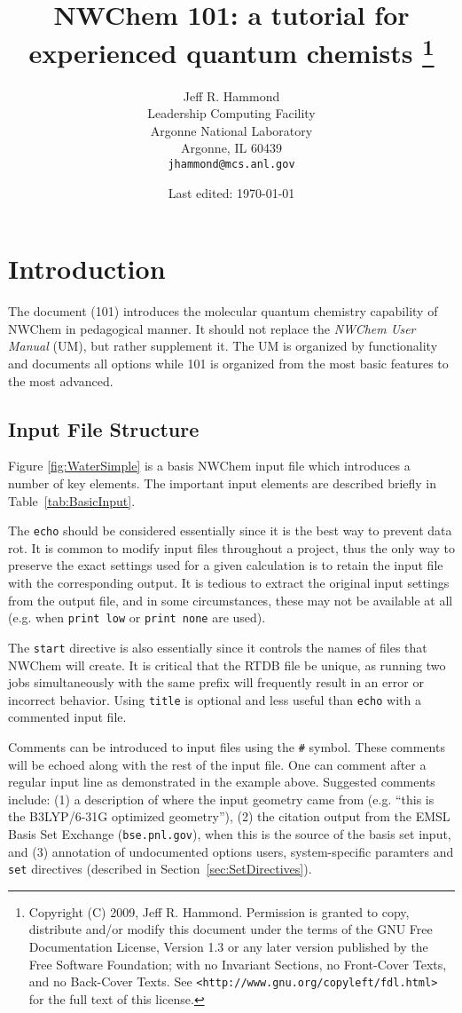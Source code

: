 \documentclass[letterpaper,12pt]{article}
\title{NWChem 101: a tutorial for experienced quantum chemists
       \footnote{
Copyright (C) 2009, Jeff R. Hammond. Permission is granted to copy, distribute and/or modify this document under the terms of the GNU Free Documentation License, Version 1.3 or any later version published by the Free Software Foundation; with no Invariant Sections, no Front-Cover Texts, and no Back-Cover Texts. See \texttt{<http://www.gnu.org/copyleft/fdl.html>} for the full text of this license.
       }
}
\author{Jeff R. Hammond \\
        Leadership Computing Facility \\
        Argonne National Laboratory \\
        Argonne, IL 60439 \\
        \texttt{jhammond@mcs.anl.gov}}
\date{Last edited: \today}
\begin{document}
\maketitle

% 

\section{Introduction}\label{sec:Introduction}

The document (101) introduces the molecular quantum chemistry capability of NWChem in pedagogical manner.  It should not replace the \textit{NWChem User Manual} (UM), but rather supplement it.  The UM is organized by functionality and documents all options while 101 is organized from the most basic features to the most advanced.

\newpage

\subsection{Input File Structure}\label{sec:InputFileStructure}

Figure \ref{fig:WaterSimple} is a basis NWChem input file which introduces a number of key elements.  The important input elements are described briefly in Table~\ref{tab:BasicInput}.

The \texttt{echo} should be considered essentially since it is the best way to prevent data rot.  It is common to modify input files throughout a project, thus the only way to preserve the exact settings used for a given calculation is to retain the input file with the corresponding output.  It is tedious to extract the original input settings from the output file, and in some circumstances, these may not be available at all (e.g. when \texttt{print low} or \texttt{print none} are used).

The \texttt{start} directive is also essentially since it controls the names of files that NWChem will create.  It is critical that the RTDB file be unique, as running two jobs simultaneously with the same prefix will frequently result in an error or incorrect behavior.  Using \texttt{title} is optional and less useful than \texttt{echo} with a commented input file.

Comments can be introduced to input files using the \texttt{\#} symbol.  These comments will be echoed along with the rest of the input file.  One can comment after a regular input line as demonstrated in the example above.  Suggested comments include: (1) a description of where the input geometry came from (e.g. ``this is the B3LYP/6-31G optimized geometry''), (2) the citation output from the EMSL Basis Set Exchange (\texttt{bse.pnl.gov}), when this is the source of the basis set input, and (3) annotation of undocumented options users, system-specific paramters and \texttt{set} directives (described in Section~\ref{sec:SetDirectives}).
\end{document}
